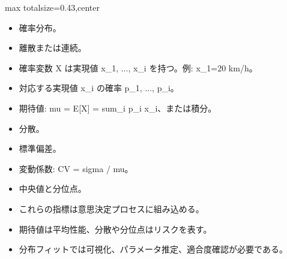 \clearpage
{}
\begin{minipage}[t]{0.405\textwidth}
\begin{adjustbox}{max totalsize={\textwidth}{0.43\textheight},center}
\begin{minipage}{\textwidth}\scriptsize
{}\begin{itemize}
\item 確率分布。
\item 離散または連続。
\item 確率変数 X は実現値 x\_1, ..., x\_i を持つ。例: x\_1=20 km/h。
\item 対応する実現値 x\_i の確率 p\_1, ..., p\_i。
\item 期待値: mu = E[X] = sum\_i p\_i x\_i、または積分。
\item 分散。
\item 標準偏差。
\item 変動係数: CV = sigma / mu。
\item 中央値と分位点。
\item これらの指標は意思決定プロセスに組み込める。
\end{itemize}\begin{itemize}
\item 期待値は平均性能、分散や分位点はリスクを表す。
\item 分布フィットでは可視化、パラメータ推定、適合度確認が必要である。
\end{itemize}
\end{minipage}
\end{adjustbox}
\end{minipage}\hfill
